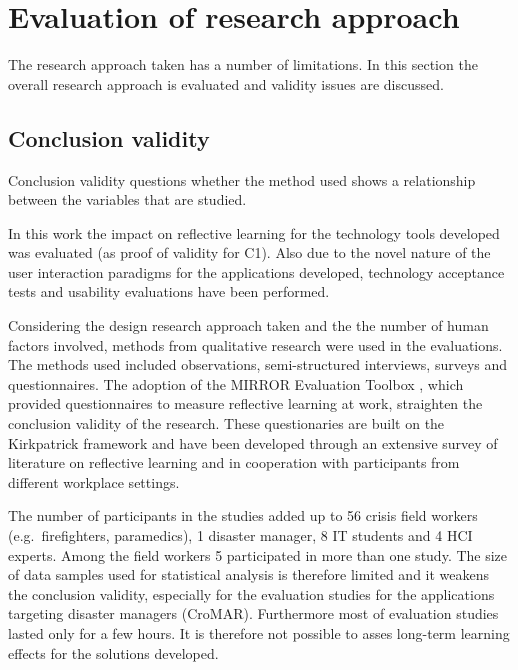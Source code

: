 \section{Evaluation of research
approach}\label{evaluation-of-research-approach}

The research approach taken has a number of limitations. In this section
the overall research approach is evaluated and validity issues are
discussed.

\subsection{Conclusion validity}\label{conclusion-validity}

Conclusion validity questions whether the method used shows a
relationship between the variables that are studied.

In this work the impact on reflective learning for the technology tools
developed was evaluated (as proof of validity for C1). Also due to the
novel nature of the user interaction paradigms for the applications
developed, technology acceptance tests and usability evaluations have
been performed.

Considering the design research approach taken and the the number of
human factors involved, methods from qualitative research were used in
the evaluations. The methods used included observations, semi-structured
interviews, surveys and questionnaires. The adoption of the MIRROR
Evaluation Toolbox \autocite{Renner:v4nLmwOk}, which provided
questionnaires to measure reflective learning at work, straighten the
conclusion validity of the research. These questionaries are built on
the Kirkpatrick framework \autocite{kirkpatrick2009evaluating} and have
been developed through an extensive survey of literature on reflective
learning and in cooperation with participants from different workplace
settings.

The number of participants in the studies added up to 56 crisis field
workers (e.g.~firefighters, paramedics), 1 disaster manager, 8 IT
students and 4 HCI experts. Among the field workers 5 participated in
more than one study. The size of data samples used for statistical
analysis is therefore limited and it weakens the conclusion validity,
especially for the evaluation studies for the applications targeting
disaster managers (CroMAR). Furthermore most of evaluation studies
lasted only for a few hours. It is therefore not possible to asses
long-term learning effects for the solutions developed.

